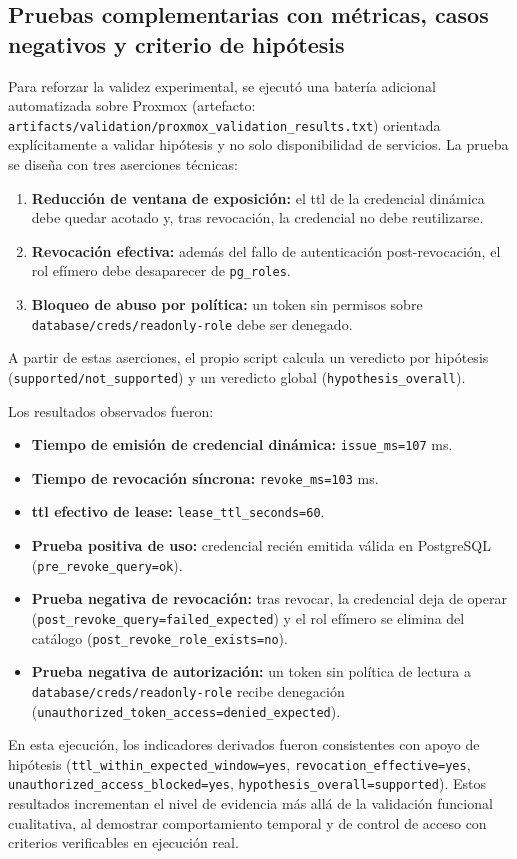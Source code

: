 \documentclass[runningheads]{llncs}
\begin{document}
\subsection{Pruebas complementarias con métricas, casos negativos y criterio de hipótesis}
Para reforzar la validez experimental, se ejecutó una batería adicional automatizada sobre Proxmox (artefacto: \texttt{artifacts/validation/proxmox\_validation\_results.txt}) orientada explícitamente a validar hipótesis y no solo disponibilidad de servicios. La prueba se diseña con tres aserciones técnicas:
\begin{enumerate}
    \item \textbf{Reducción de ventana de exposición:} el \gls{ttl} de la credencial dinámica debe quedar acotado y, tras revocación, la credencial no debe reutilizarse.
    \item \textbf{Revocación efectiva:} además del fallo de autenticación post-revocación, el rol efímero debe desaparecer de \texttt{pg\_roles}.
    \item \textbf{Bloqueo de abuso por política:} un token sin permisos sobre \texttt{database/creds/readonly-role} debe ser denegado.
\end{enumerate}
A partir de estas aserciones, el propio script calcula un veredicto por hipótesis (\texttt{supported/not\_supported}) y un veredicto global (\texttt{hypothesis\_overall}).
\par
Los resultados observados fueron:
\begin{itemize}
    \item \textbf{Tiempo de emisión de credencial dinámica:} \texttt{issue\_ms=107} ms.
    \item \textbf{Tiempo de revocación síncrona:} \texttt{revoke\_ms=103} ms.
    \item \textbf{\gls{ttl} efectivo de lease:} \texttt{lease\_ttl\_seconds=60}.
    \item \textbf{Prueba positiva de uso:} credencial recién emitida válida en PostgreSQL (\texttt{pre\_revoke\_query=ok}).
    \item \textbf{Prueba negativa de revocación:} tras revocar, la credencial deja de operar (\texttt{post\_revoke\_query=failed\_expected}) y el rol efímero se elimina del catálogo (\texttt{post\_revoke\_role\_exists=no}).
    \item \textbf{Prueba negativa de autorización:} un token sin política de lectura a \texttt{database/creds/readonly-role} recibe denegación (\texttt{unauthorized\_token\_access=denied\_expected}).
\end{itemize}
En esta ejecución, los indicadores derivados fueron consistentes con apoyo de hipótesis (\texttt{ttl\_within\_expected\_window=yes}, \texttt{revocation\_effective=yes}, \texttt{unauthorized\_access\_blocked=yes}, \texttt{hypothesis\_overall=supported}). Estos resultados incrementan el nivel de evidencia más allá de la validación funcional cualitativa, al demostrar comportamiento temporal y de control de acceso con criterios verificables en ejecución real.
\end{document}
